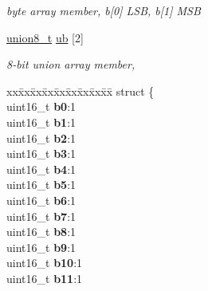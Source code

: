 \begin{DoxyCompactItemize}
\begin{DoxyCompactList}\small\item\em byte array member, b\mbox{[}0\mbox{]} L\+S\+B, b\mbox{[}1\mbox{]} M\+S\+B \end{DoxyCompactList}\item 
\hyperlink{unionunion8__t}{union8\+\_\+t} \hyperlink{unionunion16__t_a59103a8d2d60a24eb8a01c129dcd9240}{ub} \mbox{[}2\mbox{]}
\begin{DoxyCompactList}\small\item\em 8-\/bit union array member, \end{DoxyCompactList}\item 
\hypertarget{unionunion16__t_af041517dae095aca0af5ebf999928c74}{\begin{tabbing}
xx\=xx\=xx\=xx\=xx\=xx\=xx\=xx\=xx\=\kill
struct \{\\
\hypertarget{structunion16__t_1_1@2_af238a5a429a99f711824cb1d25b24478}{\>uint16\_t {\bfseries b0}:1\\
\hypertarget{structunion16__t_1_1@2_ac5beaf87670ab48728d9a628e4acf793}{\>uint16\_t {\bfseries b1}:1\\
\hypertarget{structunion16__t_1_1@2_af282affa041b41bf8f445679d8ee8737}{\>uint16\_t {\bfseries b2}:1\\
\hypertarget{structunion16__t_1_1@2_a449e69f06c046822fe123be8e58436f2}{\>uint16\_t {\bfseries b3}:1\\
\hypertarget{structunion16__t_1_1@2_a2547f7ff300b8b60754c9a716432ff67}{\>uint16\_t {\bfseries b4}:1\\
\hypertarget{structunion16__t_1_1@2_ab933a9f9988d00d45987e4dda7b298ae}{\>uint16\_t {\bfseries b5}:1\\
\hypertarget{structunion16__t_1_1@2_afbc894bfe9a782a850bcfb965bd56afe}{\>uint16\_t {\bfseries b6}:1\\
\hypertarget{structunion16__t_1_1@2_aa6ab9621a5f788909e86ec5bf8f0fbae}{\>uint16\_t {\bfseries b7}:1\\
\hypertarget{structunion16__t_1_1@2_a7d32ff757b8e2b33fa245b66715b3528}{\>uint16\_t {\bfseries b8}:1\\
\hypertarget{structunion16__t_1_1@2_a1f2c8ebb0cf5ed37a585a3982a004099}{\>uint16\_t {\bfseries b9}:1\\
\hypertarget{structunion16__t_1_1@2_a9dc76263284cb6de59d0f4f887bf7b31}{\>uint16\_t {\bfseries b10}:1\\
\hypertarget{structunion16__t_1_1@2_afce9523957aadfcd131554b4816ae9d9}{\>uint16\_t {\bfseries b11}:1\\
}}}}}}}}}}}}
\end{tabbing}}
\end{DoxyCompactItemize}

